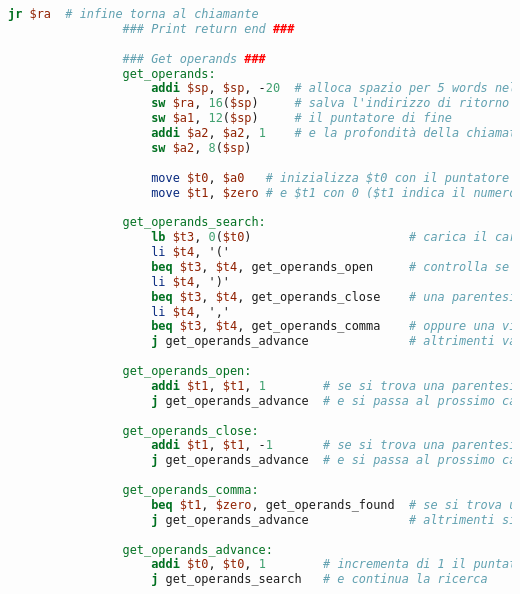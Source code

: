 \begin{center}
\begin{lstlisting}[language=mips, gobble=14, stepnumber=1]
                    jr $ra  # infine torna al chiamante
                ### Print return end ###
                
                ### Get operands ###
                get_operands:
                    addi $sp, $sp, -20  # alloca spazio per 5 words nello stack frame
                    sw $ra, 16($sp)     # salva l'indirizzo di ritorno
                    sw $a1, 12($sp)     # il puntatore di fine
                    addi $a2, $a2, 1    # e la profondità della chiamata incrementata di 1
                    sw $a2, 8($sp)
                    
                    move $t0, $a0   # inizializza $t0 con il puntatore d'inizio
                    move $t1, $zero # e $t1 con 0 ($t1 indica il numero di parentesi aperte ma non ancora chiuse)
                    
                get_operands_search:
                    lb $t3, 0($t0)                      # carica il carattere puntato da $t0
                    li $t4, '('
                    beq $t3, $t4, get_operands_open     # controlla se è una parentesi aperta
                    li $t4, ')'
                    beq $t3, $t4, get_operands_close    # una parentesi chiusa
                    li $t4, ','
                    beq $t3, $t4, get_operands_comma    # oppure una virgola
                    j get_operands_advance              # altrimenti va avanti senza fare niente
                    
                get_operands_open:
                    addi $t1, $t1, 1        # se si trova una parentesi aperta si incremente $t1
                    j get_operands_advance  # e si passa al prossimo carattere
                    
                get_operands_close:
                    addi $t1, $t1, -1       # se si trova una parentesi chiusa si decremente $t1
                    j get_operands_advance  # e si passa al prossimo carattere
                    
                get_operands_comma:
                    beq $t1, $zero, get_operands_found  # se si trova una virgola e le parentesi sono bilanciate, allora si è trovato il punto di divisione
                    j get_operands_advance              # altrimenti si passa al prossimo carattere
                    
                get_operands_advance:
                    addi $t0, $t0, 1        # incrementa di 1 il puntatore $t0
                    j get_operands_search   # e continua la ricerca
                    

\end{lstlisting}
\end{center}
